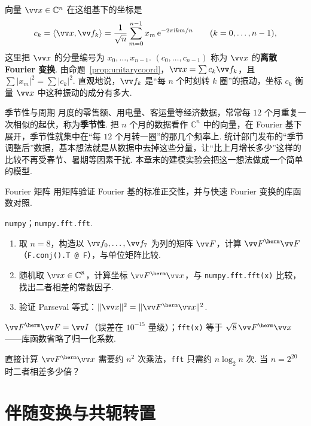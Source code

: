 	向量 $\vv x\in\mathbb{C}^n$ 在这组基下的坐标是
	\[c_k=\langle\vv x,\vv f_k\rangle=\frac1{\sqrt n}\sum_{m=0}^{n-1}x_m\,\mathrm e^{-2\pi\mathrm ikm/n}\qquad(k=0,\ldots,n-1),\]
	这里把 $\vv x$ 的分量编号为 $x_0,\ldots,x_{n-1}$. $(c_0,\ldots,c_{n-1})$ 称为 $\vv x$ 的\textbf{离散 Fourier 变换}. 由命题~\ref{prop:unitarycoord}，$\vv x=\sum c_k\vv f_k$，且 $\sum|x_m|^2=\sum|c_k|^2$. 直观地说，$\vv f_k$ 是“每 $n$ 个时刻转 $k$ 圈”的振动，坐标 $c_k$ 衡量 $\vv x$ 中这种振动的成分有多大.
	
	\begin{linkbox}{季节性与周期}
		月度的零售额、用电量、客运量等经济数据，常常每 $12$ 个月重复一次相似的起伏，称为\textbf{季节性}. 把 $n$ 个月的数据看作 $\mathbb{C}^n$ 中的向量，在 Fourier 基下展开，季节性就集中在“每 $12$ 个月转一圈”的那几个频率上. 统计部门发布的“季节调整后”数据，基本想法就是从数据中去掉这些分量，让“比上月增长多少”这样的比较不再受春节、暑期等因素干扰. 本章末的建模实验会把这一想法做成一个简单的模型.
	\end{linkbox}
	
	\begin{codebox}{Fourier 矩阵}
		 用矩阵验证 Fourier 基的标准正交性，并与快速 Fourier 变换的库函数对照.
		
		 \texttt{numpy}；\texttt{numpy.fft.fft}.
		
		\begin{enumerate}
			\item 取 $n=8$，构造以 $\vv f_0,\ldots,\vv f_7$ 为列的矩阵 $\vv F$，计算 $\vv F^\herm\vv F$（\texttt{F.conj().T @ F}），与单位矩阵比较.
			\item 随机取 $\vv x\in\mathbb{C}^8$，计算坐标 $\vv F^\herm\vv x$，与 \texttt{numpy.fft.fft(x)} 比较，找出二者相差的常数因子.
			\item 验证 Parseval 等式：$\|\vv x\|^2=\|\vv F^\herm\vv x\|^2$.
		\end{enumerate}
		
		 $\vv F^\herm\vv F=\vv I$（误差在 $10^{-15}$ 量级）；\texttt{fft(x)} 等于 $\sqrt8\,\vv F^\herm\vv x$——库函数省略了归一化系数.
		
		 直接计算 $\vv F^\herm\vv x$ 需要约 $n^2$ 次乘法，\texttt{fft} 只需约 $n\log_2n$ 次. 当 $n=2^{20}$ 时二者相差多少倍？
	\end{codebox}
	
	\section{\hC 伴随变换与共轭转置}\label{sec:adjoint}
	
